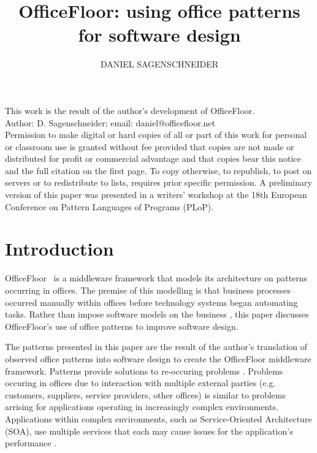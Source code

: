 \documentclass[prodmode]{style/acmlarge}
\title{OfficeFloor: using office patterns for software design}
\author{DANIEL SAGENSCHNEIDER \affil{OfficeFloor, daniel@officefloor.net}}
\begin{document}
\graphicspath{{./pdf/}}

\lstset{language=Java}

\captionsetup[lstlisting]{font=footnotesize}


\begin{bottomstuff}
This work is the result of the author's development of OfficeFloor.\\
Author: D. Sagenschneider; email: daniel@officefloor.net\\

Permission to make digital or hard copies of all or part of this work for
personal or classroom use is granted without fee provided that copies are not
made or distributed for profit or commercial advantage and that copies bear this
notice and the full citation on the first page. To copy otherwise, to republish,
to post on servers or to redistribute to lists, requires prior specific
permission. A preliminary version of this paper was presented in a writers'
workshop at the 18th European Conference on Pattern Languages of Programs
(PLoP).
\end{bottomstuff}

\maketitle




\section{Introduction}

OfficeFloor~\cite{officefloor} is a middleware framework that models its
architecture on patterns occurring in offices.  The premise of this modelling is
that business processes occurred manually within offices before technology
systems began automating tasks.  Rather than impose software models on the
business
\cite{enterprise-process-modelling,model-business-process,model-sociotechnical},
this paper discusses OfficeFloor's use of office patterns to improve software
design.

The patterns presented in this paper are the result of the author's translation
of observed office patterns into software design to create the OfficeFloor
middleware framework.  Patterns provide solutions to re-occuring problems
\cite{pattern-language}.  Problems occuring in offices due to interaction with
multiple external parties (e.g. customers, suppliers, service providers, other
offices) is similar to problems arrising for applications operating in
increasingly complex environments.  Applications within complex environments,
such as Service-Oriented Architecture (SOA), use multiple services that each may
cause issues for the application's performance \cite{reverse-ten-k-problem}.
\end{document}
